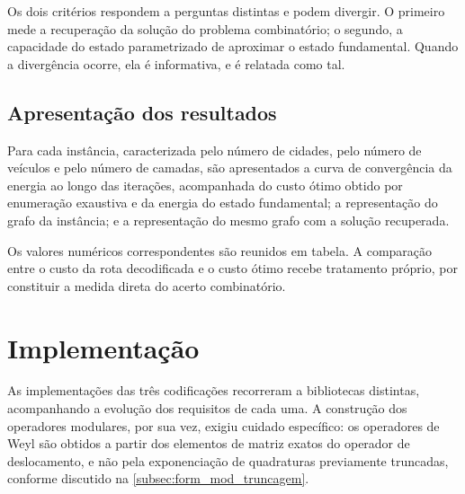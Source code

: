         Os dois critérios respondem a perguntas distintas e podem divergir. O primeiro mede a recuperação da solução do problema combinatório; o segundo, a capacidade do estado parametrizado de aproximar o estado fundamental. Quando a divergência ocorre, ela é informativa, e é relatada como tal.

    \subsection{Apresentação dos resultados}\label{subsec:met_apresentacao}

        Para cada instância, caracterizada pelo número de cidades, pelo número de veículos e pelo número de camadas, são apresentados a curva de convergência da energia ao longo das iterações, acompanhada do custo ótimo obtido por enumeração exaustiva e da energia do estado fundamental; a representação do grafo da instância; e a representação do mesmo grafo com a solução recuperada.

        Os valores numéricos correspondentes são reunidos em tabela. A comparação entre o custo da rota decodificada e o custo ótimo recebe tratamento próprio, por constituir a medida direta do acerto combinatório.

\section{Implementação}\label{sec:met_implementacao}


    As implementações das três codificações recorreram a bibliotecas distintas, acompanhando a evolução dos requisitos de cada uma. A construção dos operadores modulares, por sua vez, exigiu cuidado específico: os operadores de Weyl são obtidos a partir dos elementos de matriz exatos do operador de deslocamento, e não pela exponenciação de quadraturas previamente truncadas, conforme discutido na \autoref{subsec:form_mod_truncagem}.